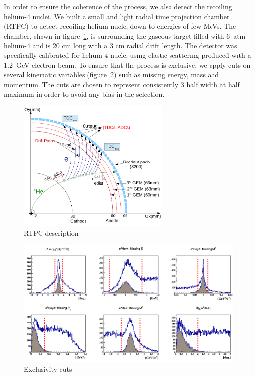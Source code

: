 \documentclass[%
 reprint,
 amsmath,amssymb,
 aps,
]{revtex4-1}
\begin{document}
In order to ensure the coherence of the process, we also detect the recoiling 
helium-4 nuclei. We built a small and light radial time projection chamber 
(RTPC) to detect recoiling helium nuclei down to energies of few MeVs. The 
chamber, shown in figure~\ref{fig:rtpc}, is surrounding the gaseous target 
filled with 6~atm helium-4 and is 20 cm long with a 3 cm radial drift 
length. The detector was specifically calibrated for helium-4 nuclei using 
elastic scattering produced with a 1.2~GeV electron beam.
To ensure that the process is exclusive, we apply cuts on 
several kinematic variables (figure~\ref{fig:exclu}) such as missing energy,
mass and momentum. The cuts are chosen to represent consistently 3 half width 
at half maximum in order to avoid any bias in the selection.


\begin{figure}[tb!]
\caption{\label{fig:rtpc} RTPC description}
\includegraphics[width=7.4cm]{RTPC.png}
\end{figure}


\begin{figure}[t!]
\caption{\label{fig:exclu} Exclusivity cuts}
\includegraphics[width=16.0cm]{all_coh_exc_cuts.png}
\end{figure}
\end{document}
